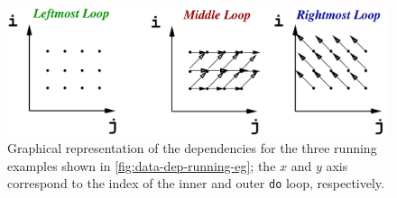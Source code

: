 \documentclass[acmsmall,review]{acmart}\settopmatter{printfolios=true,printccs=false,printacmref=false}
\begin{document}
\begin{figure}
\includegraphics[width=90ex]{Figures/L5/LoopDeps}
\caption{Graphical representation of the dependencies for the three running examples shown in \cref{fig:data-dep-running-eg}; the $x$ and $y$ axis correspond to the index of the inner and outer \lstinline{do} loop, respectively.}
\label{fig:dep-graph}
\end{figure} 
\end{document}

